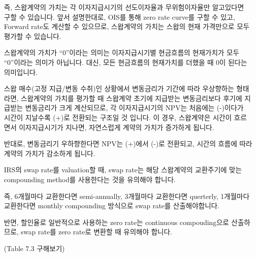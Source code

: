\documentclass[
  letterpaper,
  DIV=11,
  numbers=noendperiod]{scrreprt}
\begin{document}
즉, 스왑계약의 가치는 각 이자지급시기의 선도이자율과 무위험이자율만
알고있다면 구할 수 있습니다. 앞서 설명한대로, OIS를 통해 zero rate
curve를 구할 수 있고, Forward rate도 계산할 수 있으므로, 스왑계약의
가치는 스왑의 현재 가격만으로 모두 평가할 수 있습니다.

\begin{tcolorbox}[enhanced jigsaw, toprule=.15mm, breakable, left=2mm, leftrule=.75mm, opacitybacktitle=0.6, coltitle=black, rightrule=.15mm, colback=white, titlerule=0mm, bottomtitle=1mm, colframe=quarto-callout-important-color-frame, title=\textcolor{quarto-callout-important-color}{\faExclamation}\hspace{0.5em}{How the value changes through time}, toptitle=1mm, arc=.35mm, colbacktitle=quarto-callout-important-color!10!white, opacityback=0, bottomrule=.15mm]

스왑계약의 가치가 ``0''이라는 의미는 이자지급시기별 현금흐름의
현재가치가 모두 ``0''이라는 의미가 아닙니다. 대신, 모든 현금흐름의
현재가치를 더했을 때 0이 된다는 의미입니다.

스왑 매수(고정 지급/변동 수취)인 상황에서 변동금리가 기간에 따라
우상향하는 형태라면, 스왑계약의 가치를 평가할 때 스왑계약 초기에
지급받는 변동금리보다 후기에 지급받는 변동금리가 크게 계산되므로, 각
이자지급시기의 NPV는 처음에는 (-)이다가 시간이 지날수록 (+)로 전환되는
구조일 것 입니다. 이 경우, 스왑계약은 시간이 흐르면서 이자지급시기가
지나면, 자연스럽게 계약의 가치가 증가하게 됩니다.

반대로, 변동금리기 우하향한다면 NPV는 (+)에서 (-)로 전환되고, 시간의
흐름에 따라 계약의 가치가 감소하게 됩니다.

\end{tcolorbox}

\begin{tcolorbox}[enhanced jigsaw, toprule=.15mm, breakable, left=2mm, leftrule=.75mm, opacitybacktitle=0.6, coltitle=black, rightrule=.15mm, colback=white, titlerule=0mm, bottomtitle=1mm, colframe=quarto-callout-important-color-frame, title=\textcolor{quarto-callout-important-color}{\faExclamation}\hspace{0.5em}{Difference in compounding methods}, toptitle=1mm, arc=.35mm, colbacktitle=quarto-callout-important-color!10!white, opacityback=0, bottomrule=.15mm]

IRS의 swap rate를 valuation할 때, swap rate는 해당 스왑계약의 교환주기에
맞는 compounding method를 사용한다는 것을 유의해야 합니다.

즉, 6개월마다 교환한다면 semi-annually, 3개월마다 교환한다면 querterly,
1개월마다 교환한다면 monthly compounding 방식으로 swap rate를
산출해야합니다.

반면, 할인율로 일반적으로 사용하는 zero rate는 continuous compouding으로
산출하므로, swap rate를 zero rate로 변환할 때 유의해야 합니다.

(Table 7.3 구해보기)

\end{tcolorbox}
\end{document}
